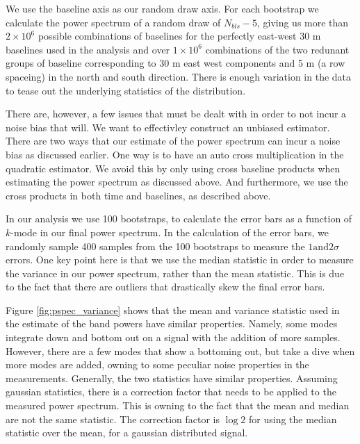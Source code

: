 \documentclass[twocolumn,numberedappendix]{emulateapj} \shorttitle{PSA64}
\begin{document}
We use the baseline axis as our random draw axis. For each bootstrap we
calculate the power spectrum of a random draw of $N_{bls}-5$, giving us more
than $2\times10^6$ possible combinations of baselines for the perfectly east-west 30 m
baselines used in the analysis and over $1\times10^{6}$ combinations of the two
redunant groups of baseline corresponding to 30 m east west components and 5 m
(a row spaceing) in the north and south direction. There is enough variation in
the data to tease out the underlying statistics of the distribution. 

There are, however, a few issues that must be dealt with in order to not incur a
noise bias that will. We want to effectivley construct an unbiased estimator.
There are two ways that our estimate of the power spectrum can incur a noise
bias as discussed earlier. One way is to have an auto cross multiplication in
the quadratic estimator. We avoid this by only using cross baseline products
when estimating the power spectrum as discussed above. And furthermore, we use
the cross products in both time and baselines, as described above.

In our analysis we use 100 bootstraps, to calculate the error bars as a function
of $k$-mode in our final power spectrum. In the calculation of the error bars,
we randomly sample 400 samples from the 100 bootstraps to measure the $1
\text{and} 2 \sigma$ errors. One key point here is that we use the median
statistic in order to measure the variance in our power spectrum, rather than
the mean statistic. This is due to the fact that there are outliers that
drastically skew the final error bars. 

Figure \ref{fig:pspec_variance} shows that the mean and variance statistic used
in the estimate of the band powers have similar properties. Namely, some modes
integrate down and bottom out on a signal with the addition of more samples.
However, there are a few modes that show a bottoming out, but take a dive when
more modes are added, owning to some peculiar noise properties in the
measurements. Generally, the two statistics have similar properties. Assuming
gaussian statistics, there is a correction factor that needs to be applied to
the measured power spectrum. This is owning to the fact that the mean and median
are not the same statistic. The correction factor is $\log{2}$ for using the
median statistic over the mean, for a gaussian distributed signal. 
\end{document}
